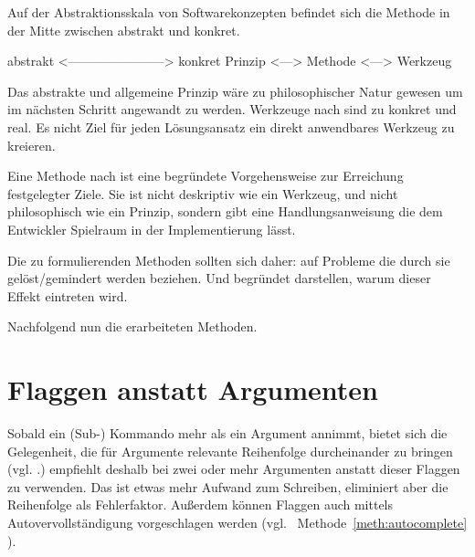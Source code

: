 \documentclass[oneside,bibliography=totocnumbered,BCOR=5mm]{scrbook}
\newenvironment{code}{\captionsetup{type=listing, skip=0pt}}{}
\begin{document}
Auf der Abstraktionsskala von Softwarekonzepten befindet sich die Methode in der
Mitte zwischen abstrakt und konkret.

\begin{code}
  \begin{shellcode}
abstrakt <-----------------------> konkret
   Prinzip <---> Methode <---> Werkzeug
  \end{shellcode}
  \medskip
\end{code}

Das abstrakte und allgemeine Prinzip \parencite{Balzert_2009} wäre zu
philosophischer Natur gewesen um im nächsten Schritt angewandt zu werden.
Werkzeuge nach \textcite{Balzert_2009} sind zu konkret und real. Es nicht Ziel
für jeden Lösungsansatz ein direkt anwendbares Werkzeug zu kreieren.

Eine Methode nach \textcite{Balzert_2009} ist eine begründete Vorgehensweise zur
Erreichung festgelegter Ziele. Sie ist nicht deskriptiv wie ein Werkzeug, und
nicht philosophisch wie ein Prinzip, sondern gibt eine Handlungsanweisung die
dem Entwickler Spielraum in der Implementierung lässt.

Die zu formulierenden Methoden sollten sich daher: auf Probleme die durch sie
gelöst/gemindert werden beziehen. Und begründet darstellen, warum dieser Effekt
eintreten wird.

Nachfolgend nun die erarbeiteten Methoden.

\newcommand{\methbox}[2]{
  \medskip
  \medskip
  \fbox{\parbox{\linewidth}{
    \refstepcounter{meth}
    \textbf{Methode~\themeth}: #2
    \label{meth:#1}
  }}
  \medskip
}
\newcommand{\methref}[1]{
  Methode~\ref{meth:#1}
}

\section{Flaggen anstatt Argumenten}

Sobald ein (Sub-) Kommando mehr als ein Argument annimmt, bietet sich die
Gelegenheit, die für Argumente relevante Reihenfolge durcheinander zu bringen
(vgl. .) \textcite{12factor} empfiehlt deshalb bei
zwei oder mehr Argumenten anstatt dieser Flaggen zu verwenden. Das ist etwas
mehr Aufwand zum Schreiben, eliminiert aber die Reihenfolge als Fehlerfaktor.
Außerdem können Flaggen auch mittels Autovervollständigung vorgeschlagen werden
(vgl.~\methref{autocomplete}).
\end{document}
